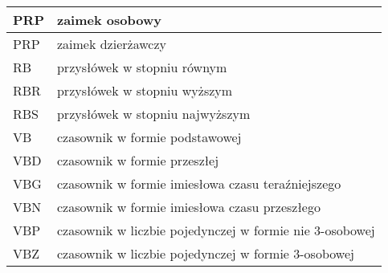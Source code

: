 \begin{table}[!h]
\begin{tabular} {| l | l |}
        PRP              & zaimek osobowy                                          \\ \hline
        PRP              & zaimek dzierżawczy                                      \\ \hline
        RB               & przysłówek w stopniu równym                             \\ \hline
        RBR              & przysłówek w stopniu wyższym                            \\ \hline
        RBS              & przysłówek w stopniu najwyższym                         \\ \hline
        VB               & czasownik w formie podstawowej                          \\ \hline
        VBD              & czasownik w formie przeszłej                            \\ \hline
        VBG              & czasownik w formie imiesłowa czasu teraźniejszego       \\ \hline
        VBN              & czasownik w formie imiesłowa czasu przeszłego           \\ \hline
        VBP              & czasownik w liczbie pojedynczej w formie nie 3-osobowej \\ \hline
        VBZ              & czasownik w liczbie pojedynczej w formie 3-osobowej     \\ \hline
    \end{tabular}
\end{table}



